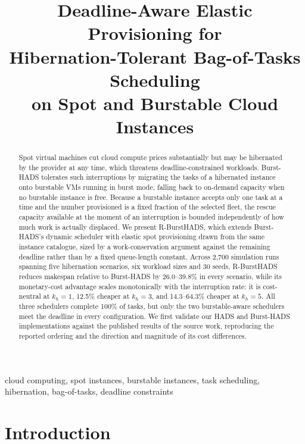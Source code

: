 \documentclass[conference]{IEEEtran}
\begin{document}
\title{Deadline-Aware Elastic Provisioning for\\Hibernation-Tolerant Bag-of-Tasks Scheduling\\on Spot and Burstable Cloud Instances}

\author{\IEEEauthorblockN{}\IEEEauthorblockA{}}

\maketitle

\begin{abstract}
Spot virtual machines cut cloud compute prices substantially but may be
hibernated by the provider at any time, which threatens deadline-constrained
workloads. Burst-HADS tolerates such interruptions by migrating the tasks of a
hibernated instance onto burstable VMs running in burst mode, falling back to
on-demand capacity when no burstable instance is free. Because a burstable
instance accepts only one task at a time and the number provisioned is a fixed
fraction of the selected fleet, the rescue capacity available at the moment of
an interruption is bounded independently of how much work is actually
displaced. We present R-BurstHADS, which extends Burst-HADS's dynamic scheduler
with elastic spot provisioning drawn from the same instance catalogue, sized by
a work-conservation argument against the remaining deadline rather than by a
fixed queue-length constant. Across 2{,}700 simulation runs spanning five
hibernation scenarios, six workload sizes and 30 seeds, R-BurstHADS reduces
makespan relative to Burst-HADS by 26.0--39.8\% in every scenario, while its
monetary-cost advantage scales monotonically with the interruption rate: it is
cost-neutral at $k_h=1$, 12.5\% cheaper at $k_h=3$, and 14.3--64.3\% cheaper at
$k_h=5$. All three schedulers complete 100\% of tasks, but only the two
burstable-aware schedulers meet the deadline in every configuration. We first
validate our HADS and Burst-HADS implementations against the published results
of the source work, reproducing the reported ordering and the direction and
magnitude of its cost differences.
\end{abstract}

\begin{IEEEkeywords}
cloud computing, spot instances, burstable instances, task scheduling,
hibernation, bag-of-tasks, deadline constraints
\end{IEEEkeywords}

\section{Introduction}
\end{document}
